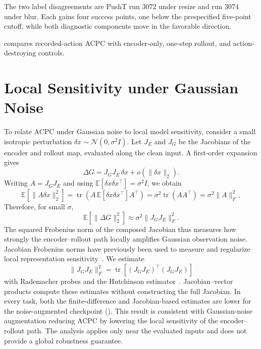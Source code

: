 \documentclass{article}
\begin{document}


The two label disagreements are PushT run 3072 under resize and run 3074 under
blur. Each gains four success points, one below the prespecified five-point
cutoff, while both diagnostic components move in the favorable direction.

 compares recorded-action ACPC
with encoder-only, one-step rollout, and action-destroying controls.


\FloatBarrier
\section{Local Sensitivity under Gaussian Noise}
\label{sec:appendix-local-sensitivity}

To relate ACPC under Gaussian noise to local model sensitivity, consider a
small isotropic perturbation $\delta x\sim\mathcal N(0,\sigma^2 I)$. Let $J_E$
and $J_G$ be the Jacobians of the encoder and rollout map, evaluated along the
clean input. A first-order expansion gives
\[
\Delta G=J_GJ_E\,\delta x+o(\|\delta x\|_2).
\]
Writing $A=J_GJ_E$ and using
$\mathbb E[\delta x\delta x^\top]=\sigma^2I$, we obtain
\begin{equation}
\mathbb E\!\left[\|A\delta x\|_2^2\right]
=\operatorname{tr}\!\left(
A\,\mathbb E[\delta x\delta x^\top]A^\top
\right)
=\sigma^2\operatorname{tr}(AA^\top)
=\sigma^2\|A\|_F^2,
\label{eq:local-gaussian-sensitivity}
\end{equation}
Therefore, for small $\sigma$,
\[
\mathbb E[\|\Delta G\|_2^2]
\approx \sigma^2\|J_GJ_E\|_F^2.
\]
The squared Frobenius norm of the composed Jacobian thus measures how strongly
the encoder--rollout path locally amplifies Gaussian observation noise.
Jacobian Frobenius norms have previously been used to measure and regularize
local representation sensitivity~\citep{rifai2011contractive}. We estimate
\[
\|J_GJ_E\|_F^2
=\operatorname{tr}\!\left[(J_GJ_E)^\top(J_GJ_E)\right]
\]
with Rademacher probes and the Hutchinson
estimator~\citep{hutchinson1989stochastic}. Jacobian--vector products compute
these estimates without constructing the full Jacobian. In every task, both
the finite-difference and Jacobian-based estimates are lower for the
noise-augmented checkpoint (). This result
is consistent with Gaussian-noise augmentation reducing ACPC by lowering the
local sensitivity of the encoder--rollout path. The analysis applies only near
the evaluated inputs and does not provide a global robustness guarantee.
\end{document}
